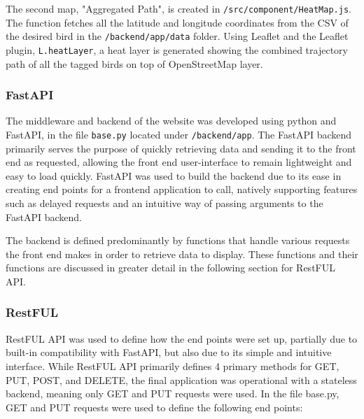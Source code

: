 \documentclass{article}
\begin{document}
The second map, "Aggregated Path", is created in \texttt{/src/component/HeatMap.js}. The function fetches all the latitude and longitude coordinates from the CSV of the desired bird in 
the \texttt{/backend/app/data} folder. Using Leaflet and the Leaflet plugin, \texttt{L.heatLayer}, a heat layer is generated showing the combined trajectory path of all the tagged birds on top of 
OpenStreetMap layer.  

\subsubsection{FastAPI}
The middleware and backend of the website was developed using python and FastAPI, in the file \texttt{base.py} located under \texttt{/backend/app}. The FastAPI backend primarily serves the purpose of quickly retrieving data and sending it to the front end as requested, allowing the front end user-interface to remain lightweight and easy to load quickly. FastAPI was used to build the backend due to its ease in creating end points for a frontend application to call, natively supporting features such as delayed requests and an intuitive way of passing arguments to the FastAPI backend.

The backend is defined predominantly by functions that handle various requests the front end makes in order to retrieve data to display. These functions and their functions are discussed in greater detail in the following section for RestFUL API.

\subsubsection{RestFUL}
RestFUL API was used to define how the end points were set up, partially due to built-in compatibility with FastAPI, but also due to its simple and intuitive interface. While RestFUL API primarily defines 4 primary methods for GET, PUT, POST, and DELETE, the final application was operational with a stateless backend, meaning only GET and PUT requests were used.
In the file base.py, GET and PUT requests were used to define the following end points:
\end{document}

